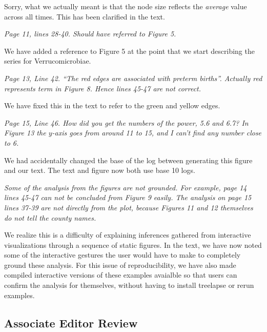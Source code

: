 \documentclass{article}
\begin{document}
Sorry, what we actually meant is that the node size reflects the
\textit{average} value across all times. This has been clarified in the text.

\textit{Page 11, lines 28-40. Should have referred to Figure 5.}

We have added a reference to Figure 5 at the point that we start describing the
series for Verrucomicrobiae.

\textit{Page 13, Line 42. ``The red edges are associated with preterm births''.
  Actually red represents term in Figure 8. Hence lines 45-47 are not correct.}

We have fixed this in the text to refer to the green and yellow edges.

\textit{Page 15, Line 46. How did you get the numbers of the power, 5.6 and 6.7?
  In Figure 13 the $y$-axis goes from around 11 to 15, and I can't find any
  number close to 6.}

We had accidentally changed the base of the log between generating this figure
and our text. The text and figure now both use base 10 logs.

\textit{Some of the analysis from the figures are not grounded. For example,
  page 14 lines 45-47 can not be concluded from Figure 9 easily. The analysis on
  page 15 lines 37-39 are not directly from the plot, because Figures 11 and 12
  themselves do not tell the county names.}

We realize this is a difficulty of explaining inferences gathered from
interactive visualizations through a sequence of static figures. In the text, we
have now noted some of the interactive gestures the user would have to make to
completely ground these analysis. For this issue of reproducibility, we have
also made compiled interactive versions of these examples avaialble so that
users can confirm the analysis for themselves, without having to install
treelapse or rerun examples.

\subsection{Associate Editor Review}
\end{document}
